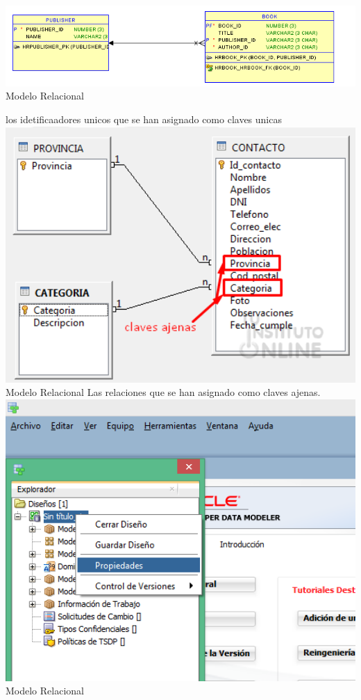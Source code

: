 \documentclass[12pt,letterpaper]{article}
\begin{document}
 \includegraphics[width=15cm]{./giselaImagen/imagen2.png} 
		\\ Modelo Relacional

los idetificaadores unicos que se han asignado como claves unicas\\
 \includegraphics[width=15cm]{./giselaImagen/imagen3.png} 
		\\ Modelo Relacional
Las relaciones que se han asignado como claves ajenas. \\
 \includegraphics[width=15cm]{./giselaImagen/imagen4.png} 
		\\ Modelo Relacional
\end{document}
